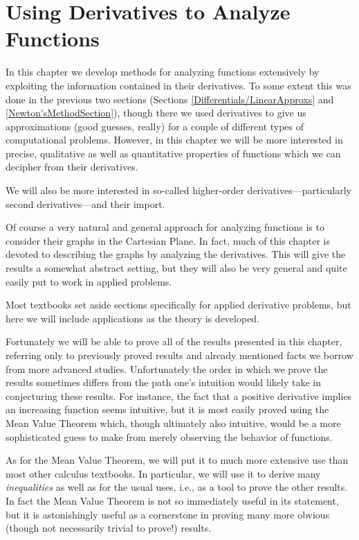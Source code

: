 \chapter{Using Derivatives to Analyze Functions
\label{DerivativesToAnalyzeFunctions}}
In this chapter we develop methods for analyzing functions
extensively by exploiting the information contained in
their derivatives.  To some extent this was done in the 
previous two sections (Sections \ref{Differentials/LinearApproxs}
and \ref{Newton'sMethodSection}), though there we used
derivatives to give us approximations (good guesses, really)
for a couple of different types of computational problems.
However, in this chapter we will be more interested in
precise, qualitative as well as quantitative properties
of functions which we can decipher from their derivatives.

We will also be more interested in so-called higher-order
derivatives---particularly second derivatives---and their 
import. 

Of course a very natural and general approach for 
analyzing functions is to consider their graphs in the Cartesian
Plane.  In fact, much of this chapter is devoted to
describing the graphs by analyzing the derivatives.
This will give the results a somewhat abstract setting,
but they will also be very general and quite easily put
to work in applied problems.  

Most textbooks set aside sections specifically for applied
derivative problems, but here we will include applications
as the theory is developed.

Fortunately we will be able to prove all of the results 
presented in this chapter, referring only to previously
proved results and already mentioned facts we borrow from
more advanced studies.  Unfortunately the order in which
we prove the results sometimes differs from the path one's
intuition would likely take in conjecturing these results.
For instance, the fact that a positive derivative implies
an increasing function seems intuitive, but it is most
easily proved using the Mean Value Theorem which, though
ultimately also intuitive, would be a more sophisticated guess
to make from merely observing the behavior of functions.

As for the Mean Value Theorem, we will put it to much more
extensive use than most other calculus textbooks.
In particular, we will use it to derive many {\it inequalities}
as well as for the usual uses, i.e., as a tool to prove the other results.
In fact the Mean Value Theorem is not so immediately useful
in its statement, but it is astonishingly useful as a
cornerstone in proving many more obvious (though not necessarily
trivial to prove!) results.
